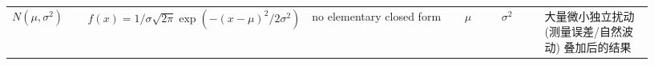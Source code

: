 \begin{landscape}
{\begin{longtable}[]{@{}p{0.12\linewidth}p{0.25\linewidth}p{0.25\linewidth}p{0.06\linewidth}p{0.07\linewidth}p{0.18\linewidth}@{}}
\(\mathit{N}(\mathit{\mu},\mathit{\sigma}^{2})\) & \(\mathit{f}(\mathit{x}) = 1/\mathit{\sigma}\sqrt{2\mathit{\pi}}\exp( - (\mathit{x} - \mathit{\mu})^{2}/2\mathit{\sigma}^{2})\) & no elementary closed form & \(\mathit{\mu}\) & \(\mathit{\sigma}^{2}\) & 大量微小独立扰动 (测量误差/自然波动) 叠加后的结果 \\
\end{longtable}
}
\end{landscape}
